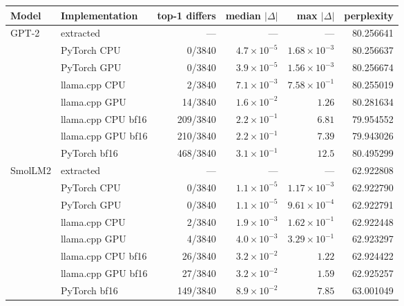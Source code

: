 \documentclass[11pt]{article}
\theoremstyle{plain}
\theoremstyle{definition}
\begin{document}
\begin{table}[t]
\centering
\footnotesize
\begin{tabular}{llrrrr}
\toprule
\textbf{Model} & \textbf{Implementation} & \textbf{top-1 differs}
  & \textbf{median} $|\Delta|$ & \textbf{max} $|\Delta|$ & \textbf{perplexity} \\
\midrule
GPT-2   & extracted            & ---      & ---                & ---                 & 80.256641 \\
        & PyTorch CPU          & 0/3840   & $4.7\times10^{-5}$ & $1.68\times10^{-3}$ & 80.256637 \\
        & PyTorch GPU          & 0/3840   & $3.9\times10^{-5}$ & $1.56\times10^{-3}$ & 80.256674 \\
        & llama.cpp CPU        & 2/3840   & $7.1\times10^{-3}$ & $7.58\times10^{-1}$ & 80.255019 \\
        & llama.cpp GPU        & 14/3840  & $1.6\times10^{-2}$ & $1.26$              & 80.281634 \\
        & llama.cpp CPU bf16   & 209/3840 & $2.2\times10^{-1}$ & $6.81$              & 79.954552 \\
        & llama.cpp GPU bf16   & 210/3840 & $2.2\times10^{-1}$ & $7.39$              & 79.943026 \\
        & PyTorch bf16         & 468/3840 & $3.1\times10^{-1}$ & $12.5$              & 80.495299 \\
\midrule
SmolLM2 & extracted            & ---      & ---                & ---                 & 62.922808 \\
        & PyTorch CPU          & 0/3840   & $1.1\times10^{-5}$ & $1.17\times10^{-3}$ & 62.922790 \\
        & PyTorch GPU          & 0/3840   & $1.1\times10^{-5}$ & $9.61\times10^{-4}$ & 62.922791 \\
        & llama.cpp CPU        & 2/3840   & $1.9\times10^{-3}$ & $1.62\times10^{-1}$ & 62.922448 \\
        & llama.cpp GPU        & 4/3840   & $4.0\times10^{-3}$ & $3.29\times10^{-1}$ & 62.923297 \\
        & llama.cpp CPU bf16   & 26/3840  & $3.2\times10^{-2}$ & $1.22$              & 62.924422 \\
        & llama.cpp GPU bf16   & 27/3840  & $3.2\times10^{-2}$ & $1.59$              & 62.925257 \\
        & PyTorch bf16         & 149/3840 & $8.9\times10^{-2}$ & $7.85$              & 63.001049 \\

\end{tabular}
\end{table}
\end{document}
